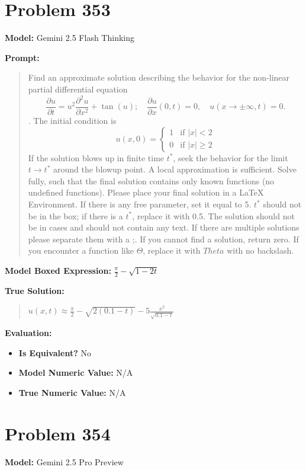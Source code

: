 \documentclass{article}
\begin{document}
{\section*{Problem 353}
\textbf{Model:} Gemini 2.5 Flash Thinking

\textbf{Prompt:}
\begin{quote}
Find an approximate solution describing the behavior for the non-linear partial differential equation $$ \frac{\partial u}{\partial t} = u^2 \frac{\partial^2 u}{\partial x^2} + \tan(u);\quad \frac{\partial u}{\partial x}(0, t) = 0,\quad u(x\to\pm\infty, t) = 0.$$. The initial condition is $$ u(x, 0) = \begin{cases} 1 & \text{if } |x| < 2 \\ 0 & \text{if } |x| \ge 2 \end{cases} $$ If the solution blows up in finite time $t^*$, seek the behavior for the limit $t \rightarrow t^*$ around the blowup point. A local approximation is sufficient. Solve fully, such that the final solution contains only known functions (no undefined functions). Please place your final solution in a \boxed{} LaTeX Environment. If there is any free parameter, set it equal to 5. $t^*$ should not be in the box; if there is a $t^*$, replace it with 0.5. The solution should not be in cases and should not contain any text. If there are multiple solutions please separate them with a ;. If you cannot find a solution, return zero. If you encounter a function like $\Theta$, replace it with $Theta$ with no backslash.
\end{quote}
\textbf{Model Boxed Expression:} $\frac{\pi}{2} - \sqrt{1-2t}$

\textbf{True Solution:}
\begin{quote}
$u(x,t) \approx \frac{\pi}{2} - \sqrt{2(0.1-t)} - 5 \frac{x^2}{\sqrt{0.1-t}}$
\end{quote}

\textbf{Evaluation:}
\begin{itemize}
\item \textbf{Is Equivalent?} No
\item \textbf{Model Numeric Value:} N/A
\item \textbf{True Numeric Value:} N/A
\end{itemize}
\vspace{1cm}
\section*{Problem 354}
\textbf{Model:} Gemini 2.5 Pro Preview

}
\end{document}

